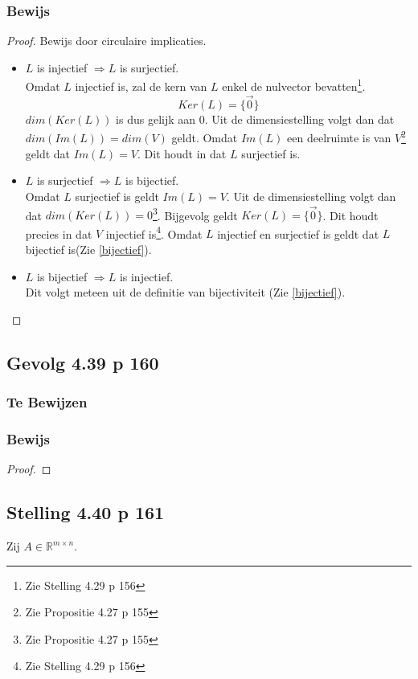 \documentclass[lineaire_algebra_oplossingen.tex]{subfiles}
\begin{document}
\subsubsection*{Bewijs}
\begin{proof}
Bewijs door circulaire implicaties.
\begin{itemize}
\item $L$ is injectief $\Rightarrow L$ is surjectief.\\
Omdat $L$ injectief is, zal de kern van $L$ enkel de nulvector bevatten\footnote{Zie Stelling 4.29 p 156}.
\[Ker(L) = \{\vec{0}\}\]
$dim(Ker(L))$ is dus gelijk aan $0$. Uit de dimensiestelling volgt dan dat $dim(Im(L)) = dim(V)$ geldt. Omdat $Im(L)$ een deelruimte is van $V$\footnote{Zie Propositie 4.27 p 155} geldt dat $Im(L) = V$. Dit houdt in dat $L$ surjectief is.

\item $L$ is surjectief $\Rightarrow L$ is bijectief.\\
Omdat $L$ surjectief is geldt $Im(L)=V$. Uit de dimensiestelling volgt dan dat $dim(Ker(L)) = 0$\footnote{Zie Propositie 4.27 p 155}. Bijgevolg geldt $Ker(L) = \{\vec{0}\}$. Dit houdt precies in dat $V$ injectief is\footnote{Zie Stelling 4.29 p 156}. Omdat $L$ injectief en surjectief is geldt dat $L$ bijectief is(Zie \ref{bijectief}).

\item $L$ is bijectief $\Rightarrow L$ is injectief.\\
Dit volgt meteen uit de definitie van bijectiviteit (Zie \ref{bijectief}).
\end{itemize}
\end{proof}

\subsection{Gevolg 4.39 p 160}
\subsubsection*{Te Bewijzen}
\subsubsection*{Bewijs}
\begin{proof}

\end{proof}

\subsection{Stelling 4.40 p 161}
Zij $A \in \mathbb{R}^{m\times n}$.
\end{document}
